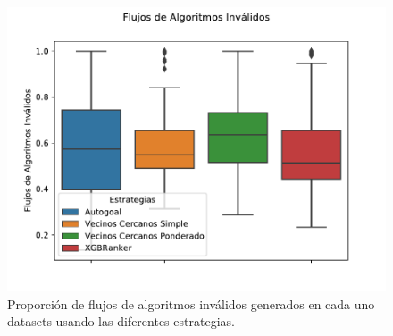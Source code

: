 \begin{figure}[H]
\centering
\includegraphics[scale=.8]{Figures/failed-pipelines.pdf}
\caption{Proporción de flujos de algoritmos inválidos generados en cada uno datasets usando las diferentes estrategias.}
\label{fig:failedpipelines}
\end{figure}

%

